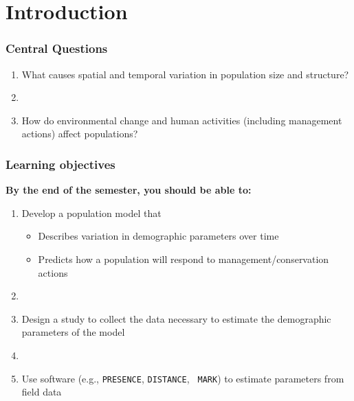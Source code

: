 \documentclass[color=usenames,dvipsnames]{beamer}
\begin{document}





\section{Introduction}


\begin{frame}
\frametitle{Central Questions}
  \large \centering
  \begin{enumerate}[\bf (1)]
    \item What causes spatial and temporal variation in population size
    and structure? \par
    \item[]
    \item<2-> How do environmental change and human activities (including
      management actions) affect populations?
  \end{enumerate}
\end{frame}



\begin{frame}
  \frametitle{Learning objectives}
  \large
  {\bf By the end of the semester, you should be able to: \\}
  \vspace{0.3cm}
  \begin{enumerate}[\bf (1)]
    \large
    \item<1-> Develop a population model that
      \begin{itemize}
        \normalsize %
        \item Describes variation in demographic parameters over time
        \item Predicts how a population will respond to
          management/conservation actions
      \end{itemize}
    \item[]
    \item<2-> Design a study to collect the data necessary to estimate
      the demographic parameters of the model
    \item[]
    \item<3-> Use software (e.g., {\tt PRESENCE}, {\tt DISTANCE}, {\tt
        MARK}) to estimate parameters from field data
  \end{enumerate}
\end{frame}
\end{document}
